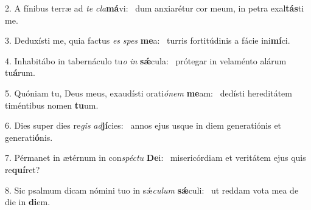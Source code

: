 2. A fínibus terræ ad \textit{te} \textit{cla}\textbf{má}vi: \ast\  dum anxiarétur cor meum, in petra exal\textbf{tás}ti me.\

3. Deduxísti me, quia factus \textit{es} \textit{spes} \textbf{me}a: \ast\  turris fortitúdinis a fácie ini\textbf{mí}ci.\

4. Inhabitábo in tabernáculo tu\textit{o} \textit{in} \textbf{sǽ}cula: \ast\  prótegar in velaménto alárum tu\textbf{á}rum.\

5. Quóniam tu, Deus meus, exaudísti orati\textit{ó}\textit{nem} \textbf{me}am: \ast\  dedísti hereditátem timéntibus nomen \textbf{tu}um.\

6. Dies super dies re\textit{gis} \textit{ad}\textbf{jí}cies: \ast\  annos ejus usque in diem generatiónis et generati\textbf{ó}nis.\

7. Pérmanet in ætérnum in con\textit{spéc}\textit{tu} \textbf{De}i: \ast\  misericórdiam et veritátem ejus quis re\textbf{quí}ret?\

8. Sic psalmum dicam nómini tuo in sǽ\textit{cu}\textit{lum} \textbf{sǽ}culi: \ast\  ut reddam vota mea de die in \textbf{di}em.\

